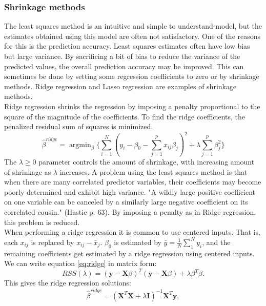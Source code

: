 \documentclass[12pt]{article}
\DeclareMathOperator*{\argmin}{argmin}
\begin{document}
\subsubsection{Shrinkage methods}
The least squares method is an intuitive and simple to understand-model, but the estimates obtained using this model are often not satisfactory. One of the reasons for this is the prediction accuracy. Least squares estimates often have low bias but large variance. By sacrificing a bit of bias to reduce the variance of the predicted values, the overall prediction accuracy may be improved. This can sometimes be done by setting some regression coefficients to zero or by shrinkage methods. Ridge regression and Lasso regression are examples of shrinkage methods.\\
Ridge regression shrinks the regression by imposing a penalty proportional to the square of the magnitude of the coefficients. To find the ridge coefficients, the penalized residual sum of squares is minimized.
\begin{equation}
\hat{\beta}^{ridge}=\argmin_{\beta}\{\sum_{i=1}^{N}(y_i-\beta_0-\sum_{j=1}^{p}x_{ij}\beta_j)^2+\lambda\sum_{j=1}^{p}\beta_j^2\}
\label{eq:ridge}
\end{equation}
The $\lambda\geq0$ parameter controls the amount of shrinkage, with increasing amount of shrinkage as $\lambda$ increases. A problem using the least squares method is that when there are many correlated predictor variables, their coefficients may become poorly determined and exhibit high variance. "A wildly large positive coefficient on one variable can be canceled by a similarly large negative coefficient on its correlated cousin." (Hastie p. 63). By imposing a penalty as in Ridge regression, this problem is reduced.\\
When performing a ridge regression it is common to use centered inputs. That is, each $x_{ij}$ is replaced by $x_{ij} - \bar{x}_j$. $\beta_0$ is estimated by $\bar{y}=\frac{1}{N}\sum_{1}^{N}y_i$, and the remaining coefficients get estimated by a ridge regression using centered inputs. We can write equation \ref{eq:ridge} in matrix form:\\
\begin{equation}
RSS(\lambda) = (\bm{y}-\bm{X}\beta)^T(\bm{y}-\bm{X}\beta)+\lambda\beta^T\beta.
\end{equation}
This gives the ridge regression solutions:
\begin{equation}
\hat{\beta}^{ridge} = (\bm{X}^T\bm{X}+\lambda\bm{I})^{-1}\bm{X}^T\bm{y},
\end{equation}
\end{document}
